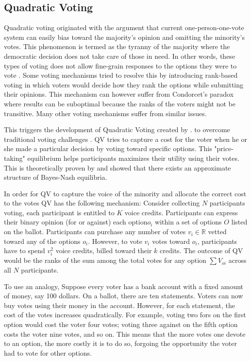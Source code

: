 \subsection{Quadratic Voting}
Quadratic voting originated 
with the argument
that current one-person-one-vote system
can easily bias toward the majority's opinion
and omitting the minority's votes\cite{posner2018radical}.
This phenomenon is termed as the tyranny of the majority
where the democratic decision 
does not take care of those in need.
In other words, these types of voting
does not allow fine-grain responses
to the options they were to vote \cite{sep-voting-methods}.
Some voting mechanisms tried to resolve this
by introducing rank-based voting 
in which voters would decide
how they rank the options
while submitting their opinions.
This mechanism can however
suffer from Condorcet's paradox 
where results can be suboptimal 
because the ranks of the voters
might not be transitive\cite{sep-voting-methods}.
Many other voting mechanisms suffer from similar issues.

This triggers the development of Quadratic Voting
created by \textcite{posner2018radical}. 
to overcome traditional voting challenges .
QV tries to capture a cost 
for the voter when he or she
made a particular decision by voting toward specific options.
This "price-taking" equilibrium helps
participants maximizes their utility using their votes.
This is theoretically proven by \textcite{lalley2018quadratic}
and showed that there exists an approximate structure of Bayes-Nash equilibria.

In order for QV to capture the voice of the minority
and allocate the correct cost to the votes
QV has the following mechanism:
Consider collecting $N$ participants voting,
each participant is entitled to 
$K$ voice credits.
Participants can express their binary opinion 
(for or against)
each option$o_i$ within a set of options $O$ listed on the ballot. 
Participants can purchase any number of votes $v_i \in \mathbb{R}$
vetted toward any of the options $o_i$.
However, to vote $v_i$ votes toward $o_i$,
participants have to spend $v_i^2$ voice credits,
billed toward their $k$ credits.
The outcome of QV 
would be the ranks of the sum
among the total votes for any option $\sum{V_{oi}}$
across all $N$ participants.

To use an analogy,
Suppose every voter has a bank account 
with a fixed amount of money, say 100 dollars.
On a ballot, there are ten statements.
Voters can now buy votes using their money in the account.
However, for each statement, the cost of the votes
increases quadratically. 
For example, voting two fors on the first option 
would cost the voter four votes;
voting three against on the fifth option 
costs the voter nine votes, and so on.
This means that the more votes one devote to an option,
the more costly it is to do so,
forgoing the opportunity the voter had
to vote for other options.

